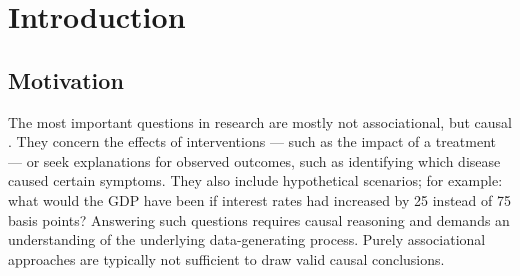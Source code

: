 




\chapter{Introduction}

\section{Motivation}


The most important questions in research are mostly not associational, but causal \citep{pearl2009}. They concern the effects of interventions --- such as the impact of a treatment --- or seek explanations for observed outcomes, such as identifying which disease caused certain symptoms. They also include hypothetical scenarios; for example: what would the GDP have been if interest rates had increased by 25 instead of 75 basis points? Answering such questions requires causal reasoning and demands an understanding of the underlying data-generating process. Purely associational approaches are typically not sufficient to draw valid causal conclusions.



